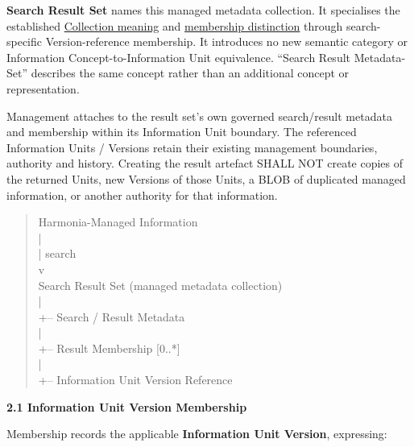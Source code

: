 \textbf{Search Result Set} names this managed metadata collection. It specialises
the established \href{\detokenize{../../../../../docs/markdown/04-information-architecture/metamodel/information-architecture-metamodel.md#21-semantic-classifications}}{Collection meaning}
and \href{\detokenize{../../../../../docs/markdown/04-information-architecture/patterns/containment-and-collections.md#3-collections-vs-containment-distinct-semantics}}{membership distinction}
through search-specific Version-reference membership. It introduces no new
semantic category or Information Concept-to-Information Unit equivalence.
“Search Result Metadata-Set” describes the same concept rather than an
additional concept or representation.



Management attaches to the result set's own governed search/result metadata
and membership within its Information Unit boundary. The referenced
Information Units / Versions retain their existing management boundaries,
authority and history. Creating the result artefact SHALL NOT create copies
of the returned Units, new Versions of those Units, a BLOB of duplicated
managed information, or another authority for that information.



\begin{quote}\small\ttfamily
Harmonia-Managed Information\\
        |\\
        | search\\
        v\\
Search Result Set (managed metadata collection)\\
        |\\
        +-- Search / Result Metadata\\
        |\\
        +-- Result Membership [0..*]\\
                |\\
                +-- Information Unit Version Reference\\

\end{quote}


\par\medskip\textbf{2.1 Information Unit Version Membership}\par


Membership records the applicable \textbf{Information Unit Version}, expressing:



